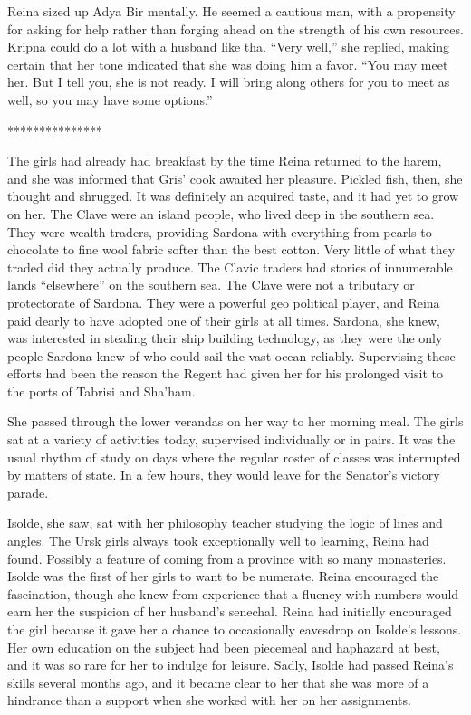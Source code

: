 \documentclass{article}
\begin{document}
	Reina sized up Adya Bir mentally. He seemed a cautious man, with a propensity for asking for help rather than forging ahead on the strength of his own resources. Kripna could do a lot with a husband like tha. “Very well,” she replied, making certain that her tone indicated that she was doing him a favor. “You may meet her. But I tell you, she is not ready. I will bring along others for you to meet as well, so you may have some options.”
	
	***************
	
	The girls had already had breakfast by the time Reina returned to the harem, and she was informed that Gris’ cook awaited her pleasure. Pickled fish, then, she thought and shrugged. It was definitely an acquired taste, and it had yet to grow on her. The Clave were an island people,  who lived deep in the southern sea. They were wealth traders, providing Sardona with everything from pearls to chocolate to fine wool fabric softer than the best cotton. Very little of what they traded did they actually produce. The Clavic traders had stories of innumerable lands “elsewhere” on the southern sea. The Clave were not a tributary or protectorate of Sardona. They were a powerful geo political player, and Reina paid dearly to have adopted one of their girls at all times. Sardona, she knew, was interested in stealing their ship building technology, as they were the only people Sardona knew of who could sail the vast ocean reliably. Supervising these efforts had been the reason the Regent had given her for his prolonged visit to the ports of Tabrisi and Sha’ham. 
	
	She passed through the lower verandas on her way to her morning meal. The girls sat at a variety of activities today, supervised individually or in pairs. It was the usual rhythm of study on days where the regular roster of classes was interrupted by matters of state. In a few hours, they would leave for the Senator’s victory parade. 
	
	Isolde, she saw, sat with her philosophy teacher studying the logic of lines and angles. The Ursk girls always took exceptionally well to learning, Reina had found. Possibly a feature of coming from a province with so many monasteries. Isolde was the first of her girls to want to be numerate. Reina encouraged the fascination, though she knew from experience that a fluency with numbers would earn her the suspicion of her husband’s senechal. Reina had initially encouraged the girl because it gave her a chance to occasionally eavesdrop on Isolde’s lessons. Her own education on the subject had been piecemeal and haphazard at best, and it was so rare for her to indulge for leisure. Sadly, Isolde had passed Reina’s skills several months ago, and it became clear to her that she was more of a hindrance than a support when she worked with her on her assignments. 
	
\end{document}
